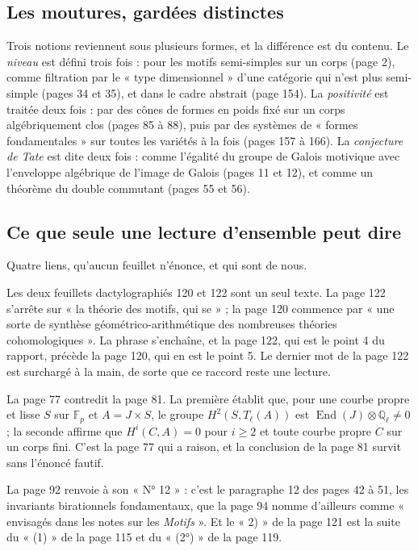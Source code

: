 \documentclass[11pt,a4paper]{article}
\begin{document}
\subsection*{Les moutures, gardées distinctes}

Trois notions reviennent sous plusieurs formes, et la différence est du
contenu. Le \emph{niveau} est défini trois fois : pour les motifs semi-simples
sur un corps (page 2), comme filtration par le « type dimensionnel » d'une
catégorie qui n'est plus semi-simple (pages 34 et 35), et dans le cadre abstrait
(page 154). La \emph{positivité} est traitée deux fois : par des cônes de formes
en poids fixé sur un corps algébriquement clos (pages 85 à 88), puis par des
systèmes de « formes fondamentales » sur toutes les variétés à la fois (pages
157 à 166). La \emph{conjecture de Tate} est dite deux fois : comme l'égalité
du groupe de Galois motivique avec l'enveloppe algébrique de l'image de Galois
(pages 11 et 12), et comme un théorème du double commutant (pages 55 et 56).

\subsection*{Ce que seule une lecture d'ensemble peut dire}

Quatre liens, qu'aucun feuillet n'énonce, et qui sont de nous.

Les deux feuillets dactylographiés 120 et 122 sont un seul texte. La page 122
s'arrête sur « la théorie des motifs, qui se » ; la page 120 commence par « une
sorte de synthèse géométrico-arithmétique des nombreuses théories
cohomologiques ». La phrase s'enchaîne, et la page 122, qui est le point 4 du
rapport, précède la page 120, qui en est le point 5. Le dernier mot de la page
122 est surchargé à la main, de sorte que ce raccord reste une lecture.

La page 77 contredit la page 81. La première établit que, pour une courbe
propre et lisse $S$ sur $\mathbb{F}_{p}$ et $A = J \times S$, le groupe
$H^{2}(S, T_{\ell}(A))$ est $\operatorname{End}(J) \otimes \mathbb{Q}_{\ell}
\neq 0$ ; la seconde affirme que $H^{i}(C, A) = 0$ pour $i \geqslant 2$ et
toute courbe propre $C$ sur un corps fini. C'est la page 77 qui a raison, et la
conclusion de la page 81 survit sans l'énoncé fautif.

La page 92 renvoie à son « N° 12 » : c'est le paragraphe 12 des pages 42 à 51,
les invariants birationnels fondamentaux, que la page 94 nomme d'ailleurs
comme « envisagés dans les notes sur les \emph{Motifs} ». Et le « 2) » de la
page 121 est la suite du « (1) » de la page 115 et du « (2°) » de la page 119.
\end{document}

